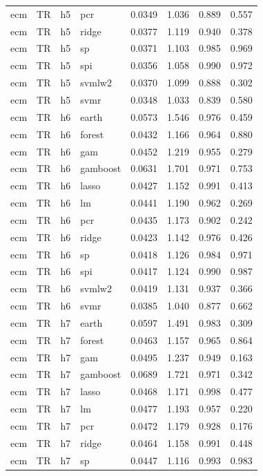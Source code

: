 \begin{ThreePartTable}
\begin{longtable}[t]{llclcccc}
ecm & TR & h5 & pcr & 0.0349 & 1.036 & 0.889 & 0.557\\
ecm & TR & h5 & ridge & 0.0377 & 1.119 & 0.940 & 0.378\\
ecm & TR & h5 & sp & 0.0371 & 1.103 & 0.985 & 0.969\\
ecm & TR & h5 & spi & 0.0356 & 1.058 & 0.990 & 0.972\\
ecm & TR & h5 & svmlw2 & 0.0370 & 1.099 & 0.888 & 0.302\\
ecm & TR & h5 & svmr & 0.0348 & 1.033 & 0.839 & 0.580\\
\addlinespace
ecm & TR & h6 & earth & 0.0573 & 1.546 & 0.976 & 0.459\\
ecm & TR & h6 & forest & 0.0432 & 1.166 & 0.964 & 0.880\\
ecm & TR & h6 & gam & 0.0452 & 1.219 & 0.955 & 0.279\\
ecm & TR & h6 & gamboost & 0.0631 & 1.701 & 0.971 & 0.753\\
ecm & TR & h6 & lasso & 0.0427 & 1.152 & 0.991 & 0.413\\
ecm & TR & h6 & lm & 0.0441 & 1.190 & 0.962 & 0.269\\
ecm & TR & h6 & pcr & 0.0435 & 1.173 & 0.902 & 0.242\\
ecm & TR & h6 & ridge & 0.0423 & 1.142 & 0.976 & 0.426\\
ecm & TR & h6 & sp & 0.0418 & 1.126 & 0.984 & 0.971\\
ecm & TR & h6 & spi & 0.0417 & 1.124 & 0.990 & 0.987\\
ecm & TR & h6 & svmlw2 & 0.0419 & 1.131 & 0.937 & 0.366\\
ecm & TR & h6 & svmr & 0.0385 & 1.040 & 0.877 & 0.662\\
\addlinespace
ecm & TR & h7 & earth & 0.0597 & 1.491 & 0.983 & 0.309\\
ecm & TR & h7 & forest & 0.0463 & 1.157 & 0.965 & 0.864\\
ecm & TR & h7 & gam & 0.0495 & 1.237 & 0.949 & 0.163\\
ecm & TR & h7 & gamboost & 0.0689 & 1.721 & 0.971 & 0.342\\
ecm & TR & h7 & lasso & 0.0468 & 1.171 & 0.998 & 0.477\\
ecm & TR & h7 & lm & 0.0477 & 1.193 & 0.957 & 0.220\\
ecm & TR & h7 & pcr & 0.0472 & 1.179 & 0.928 & 0.176\\
ecm & TR & h7 & ridge & 0.0464 & 1.158 & 0.991 & 0.448\\
ecm & TR & h7 & sp & 0.0447 & 1.116 & 0.993 & 0.983\\

\end{longtable}
\end{ThreePartTable}
